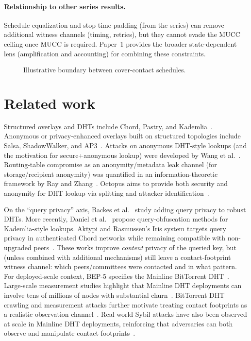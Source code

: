 \documentclass[11pt]{article}
\begin{document}
\paragraph{Relationship to other series results.}
Schedule equalization and stop-time padding (from the series) can remove additional witness channels (timing, retries), but they cannot evade the MUCC ceiling once MUCC is required.
Paper~1 provides the broader state-dependent lens (amplification and accounting) for combining these constraints.

\begin{figure}[t]
  \centering
  \caption{Illustrative boundary between cover-contact schedules.}
\end{figure}


\section{Related work}
Structured overlays and DHTs include Chord, Pastry, and Kademlia~\cite{stoica2001chord,rowstron2001pastry,maymounkov2002kademlia}.
Anonymous or privacy-enhanced overlays built on structured topologies include Salsa, ShadowWalker, and AP3~\cite{nambiar2006salsa,mittal2009shadowwalker,mislove2006ap3}.
Attacks on anonymous DHT-style lookups (and the motivation for secure+anonymous lookup) were developed by Wang et al.~\cite{wang2010anonymousLookupAttacks,mittal2012informationleaks}.
Routing-table compromise as an anonymity/metadata leak channel (for storage/recipient anonymity) was quantified in an information-theoretic framework by Ray and Zhang~\cite{ray2007itframework}.
Octopus aims to provide both security and anonymity for DHT lookup via splitting and attacker identification~\cite{wang2012octopus}.

On the ``query privacy'' axis, Backes et al.~\cite{backes2012queryprivacy} study adding query privacy to robust DHTs.
More recently, Daniel et al.~\cite{daniel2025kademliaObfuscation} propose query-obfuscation methods for Kademlia-style lookups.
Aktypi and Rasmussen's Iris system targets query privacy in authenticated Chord networks while remaining compatible with non-upgraded peers~\cite{aktypi2025iris}.
These works improve \emph{content} privacy of the queried key, but (unless combined with additional mechanisms) still leave a contact-footprint witness channel: which peers/committees were contacted and in what pattern.
For deployed-scale context, BEP-5 specifies the Mainline BitTorrent DHT~\cite{bep5}.
Large-scale measurement studies highlight that Mainline DHT deployments can involve tens of millions of nodes with substantial churn~\cite{wang2013mldht,mldhtProjectPage}.
BitTorrent DHT crawling and measurement attacks further motivate treating contact footprints as a realistic observation channel~\cite{wolchok2010crawling,falkner2007profiling}.
Real-world Sybil attacks have also been observed at scale in Mainline DHT deployments, reinforcing that adversaries can both observe and manipulate contact footprints~\cite{wang2012sybil}.
\end{document}
